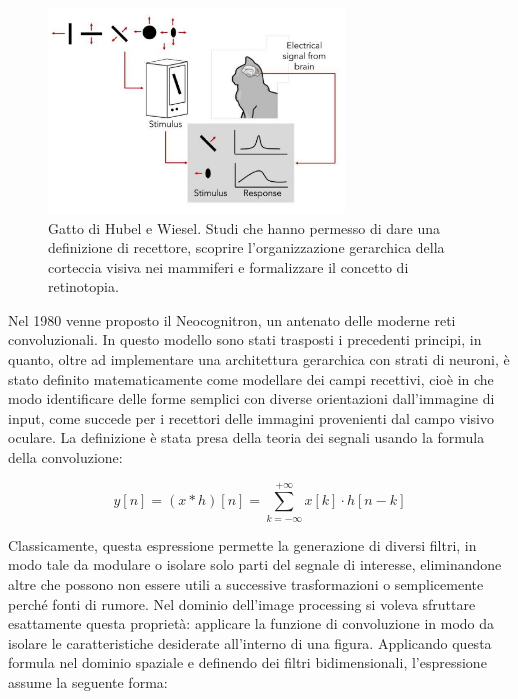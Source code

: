 \begin{figure}[htbp]
    \centering
    \includegraphics[width=0.7\textwidth]{figures/Hubel_and_Wiesel_cat.png}
    \caption{Gatto di Hubel e Wiesel\cite{a5catexp}. Studi che hanno permesso di dare una definizione di recettore, scoprire l'organizzazione gerarchica della corteccia visiva nei mammiferi e formalizzare il concetto di retinotopia.}
    \label{fig:chatto}
\end{figure}


\noindent Nel 1980 venne proposto il Neocognitron, un antenato delle moderne reti convoluzionali. In questo modello sono stati trasposti i precedenti principi, in quanto, oltre ad implementare una architettura gerarchica con strati di neuroni, è stato definito matematicamente come modellare dei campi recettivi, cioè in che modo identificare delle forme semplici con diverse orientazioni dall'immagine di input, come succede per i recettori delle immagini provenienti dal campo visivo oculare. La definizione è stata presa della teoria dei segnali usando la formula della convoluzione: 

\begin{equation} \label{eq:convolution}
y[n] = (x * h)[n] = \sum_{k=-\infty}^{+\infty} x[k] \cdot h[n - k]
\end{equation}

\noindent Classicamente, questa espressione permette la generazione di diversi filtri, in modo tale da modulare o isolare solo parti del segnale di interesse, eliminandone altre che possono non essere utili a successive trasformazioni o semplicemente perché fonti di rumore. Nel dominio dell'image processing si voleva sfruttare esattamente questa proprietà: applicare la funzione di convoluzione in modo da isolare le caratteristiche desiderate all'interno di una figura. Applicando questa formula nel dominio spaziale e definendo dei filtri bidimensionali, l'espressione assume la seguente forma: 

